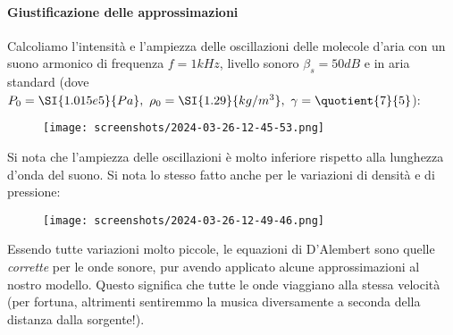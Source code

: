\paragraph{Giustificazione delle approssimazioni}
Calcoliamo l'intensità e l'ampiezza delle oscillazioni delle molecole d'aria con un suono armonico di frequenza \(f= 1 \unit{kHz}\), livello sonoro \(\beta _s = 50 \unit{dB}\) e in aria standard (dove \(P_0 = \SI{1.015e5}{Pa},\ \rho _0 = \SI{1.29}{kg / m^3},\ \gamma = \quotient{7}{5} \)):
\begin{figure}[H]
	\centering
	\texttt{[image: screenshots/2024-03-26-12-45-53.png]}
\end{figure}
Si nota che l'ampiezza delle oscillazioni è molto inferiore rispetto alla lunghezza d'onda del suono. Si nota lo stesso fatto anche per le variazioni di densità e di pressione:
\begin{figure}[H]
	\centering
	\texttt{[image: screenshots/2024-03-26-12-49-46.png]}
\end{figure}
Essendo tutte variazioni molto piccole, le equazioni di D'Alembert sono quelle \emph{corrette} per le onde sonore, pur avendo applicato alcune approssimazioni al nostro modello. Questo significa che tutte le onde viaggiano alla stessa velocità (per fortuna, altrimenti sentiremmo la musica diversamente a seconda della distanza dalla sorgente!).